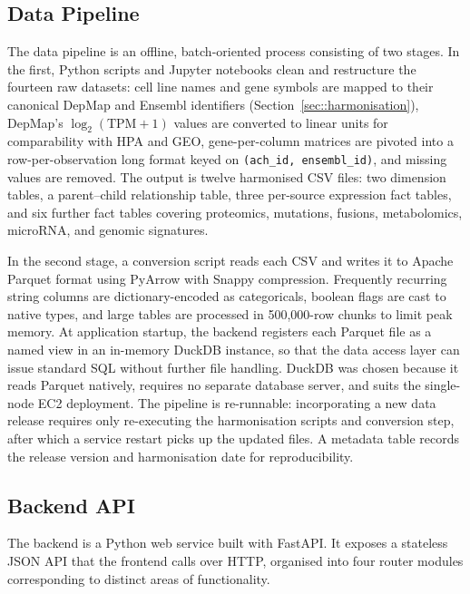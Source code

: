 \subsection{Data Pipeline}
\label{sec:data-pipeline}

The data pipeline is an offline, batch-oriented process consisting of two stages. In the first, Python scripts and Jupyter notebooks clean and restructure the fourteen raw datasets: cell line names and gene symbols are mapped to their canonical DepMap and Ensembl identifiers (Section~\ref{sec::harmonisation}), DepMap's $\log_2(\text{TPM}+1)$ values are converted to linear units for comparability with HPA and GEO, gene-per-column matrices are pivoted into a row-per-observation long format keyed on \texttt{(ach\_id, ensembl\_id)}, and missing values are removed. The output is twelve harmonised CSV files: two dimension tables, a parent--child relationship table, three per-source expression fact tables, and six further fact tables covering proteomics, mutations, fusions, metabolomics, microRNA, and genomic signatures.

In the second stage, a conversion script reads each CSV and writes it to Apache Parquet format using PyArrow with Snappy compression. Frequently recurring string columns are dictionary-encoded as categoricals, boolean flags are cast to native types, and large tables are processed in 500{,}000-row chunks to limit peak memory. At application startup, the backend registers each Parquet file as a named view in an in-memory DuckDB instance, so that the data access layer can issue standard SQL without further file handling. DuckDB was chosen because it reads Parquet natively, requires no separate database server, and suits the single-node EC2 deployment. The pipeline is re-runnable: incorporating a new data release requires only re-executing the harmonisation scripts and conversion step, after which a service restart picks up the updated files. A metadata table records the release version and harmonisation date for reproducibility.


\subsection{Backend API}
\label{sec:backend-api}

The backend is a Python web service built with FastAPI. It exposes a stateless JSON API that the frontend calls over HTTP, organised into four router modules corresponding to distinct areas of functionality.

